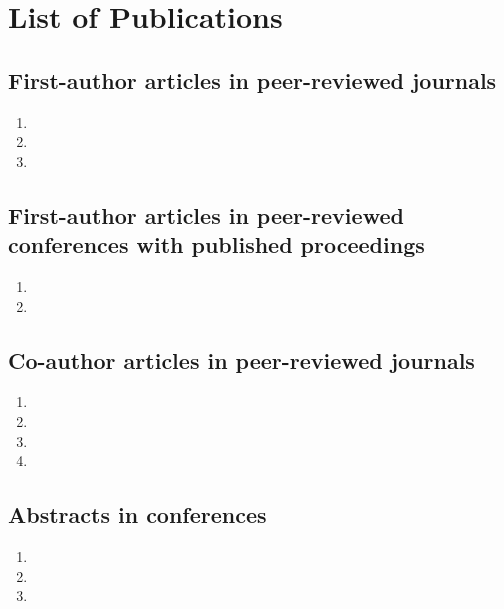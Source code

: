 \chapter{List of Publications}

\section*{First-author articles in peer-reviewed journals} %
\label{sec:first_author_journal_articles}
\begin{enumerate}
  \item {}
  \item {}
  \item {}%
\end{enumerate}

\section*{First-author articles in peer-reviewed conferences with published proceedings}
\label{sec:first_author_peer_reviewed_conference_papers}
\begin{enumerate}
  \item {\sloppy {}}
  \item {}
\end{enumerate}

\section*{Co-author articles in peer-reviewed journals} %
\label{sec:journal_articles}
\begin{enumerate}
  \item {}
  \item {}
  \item {}
  \item {}
\end{enumerate}

\section*{Abstracts in conferences} %
\label{sec:abstracts}
\begin{enumerate}
  \item {}
  \item {}
  \item {}
\end{enumerate}
